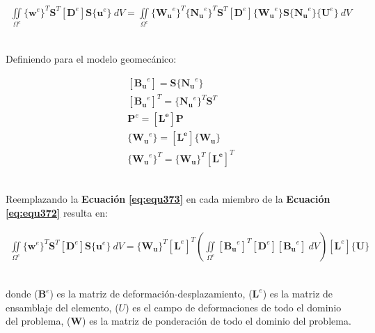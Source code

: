 \begin{ceqn} %
\begin{gather}\label{eq:equ372}
\iint \limits_{\Omega^e} \{\mathbf{w}^e\}^T \mathbf{S}^T[\mathbf{D}^e]\mathbf{S}\{\mathbf{u}^e\}\ dV = 
\iint \limits_{\Omega^e} \{\mathbf{W_u}^e\}^T \{\mathbf{N_u}^e\}^T \mathbf{S}^T  [\mathbf{D}^e] \{\mathbf{W_u}^e\} \mathbf{S} \{\mathbf{N_u}^e\} \{\mathbf{U}^e\}\ dV
\end{gather}   
\end{ceqn}
\\
Definiendo para el modelo geomecánico:

\begin{ceqn} 
\begin{subequations} \label{eq:equ373} 
\begin{gather}
[\mathbf{B_u}^e] = \mathbf{S} \{\mathbf{N_u}^e\} \label{eq:equ373a}\\[10pt]
[\mathbf{B_u}^e]^T = \{\mathbf{N_u}^e\}^T \mathbf{S}^T  \label{eq:equ373b}\\[10pt]
\mathbf{P}^e =  \left[\mathbf{L^e}\right] \mathbf{P} \label{eq:equ373c}\\[10pt]
\{\mathbf{W_u}^e\} = \left[\mathbf{L^e}\right] \{\mathbf{W_u}\}  \label{eq:equ373d}\\[10pt]
\{\mathbf{W_u}^e\}^T = \{\mathbf{W_u}\}^T \left[\mathbf{L^e}\right]^T  \label{eq:equ373e}
\end{gather}  
\end{subequations} 
\end{ceqn}
\\
Reemplazando la \textbf{Ecuación} \textbf{\ref{eq:equ373}} en cada miembro de la \textbf{Ecuación} \textbf{\ref{eq:equ372}} resulta en:

\begin{ceqn} %
\begin{gather}\label{eq:equ374}
\iint \limits_{\Omega^e} \{\mathbf{w}^e\}^T \mathbf{S}^T[\mathbf{D}^e]\mathbf{S}\{\mathbf{u}^e\}\ dV = 
\{\mathbf{W_u}\}^T \left[\mathbf{L}^e\right]^T \left( \iint \limits_{\Omega^e}  [\mathbf{B_u}^e]^T [\mathbf{D}^e] [\mathbf{B_u}^e]\ dV \right) \left[\mathbf{L}^e\right] \{\mathbf{U}\}
\end{gather}   
\end{ceqn}
\\
donde ($\mathbf{B}^e$) es la matriz de deformación-desplazamiento, ($\mathbf{L}^e$) es la matriz de ensamblaje del elemento, ($U$) es el campo de deformaciones de todo el dominio del problema, ($\mathbf{W}$) es la matriz de ponderación de todo el dominio del problema.\bigskip 

